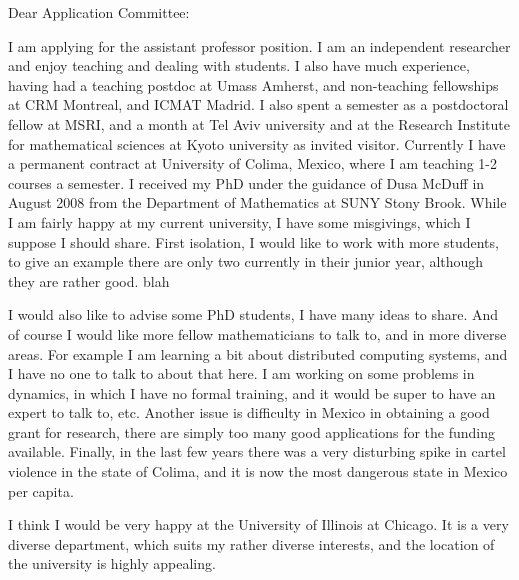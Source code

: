 \documentclass[12pt]{letter}
\date{Fall 2018}
\begin{document}
\begin{letter}{
}
\opening{Dear Application Committee:}   
I am applying for the assistant professor position. I am an independent researcher and enjoy teaching and dealing with students.
I also have much experience, having had a teaching postdoc at Umass Amherst, 
and non-teaching fellowships at CRM Montreal, and ICMAT Madrid. I also spent a semester as a postdoctoral fellow at MSRI, and a
month at Tel Aviv university and at the Research Institute for mathematical
sciences at Kyoto university as invited visitor. Currently I have a permanent contract at University of Colima,  Mexico, where I am teaching 1-2 courses a semester.
I received my PhD under the 
guidance of Dusa McDuff
in August 2008 from
the Department of Mathematics at SUNY Stony Brook.  While I am fairly happy at my current university,  
I have some misgivings, which I suppose I should share.
First isolation, I would like to work with more students, to give an example there are only two currently in their junior year, although they are rather good. blah

I would also like to advise some PhD students, I have many ideas to share. And of course I would like more fellow mathematicians to talk to, and in more diverse areas. For example I am learning a bit about distributed computing systems, and I have no one to talk to about that here. I am working on some problems in dynamics, in which I have no formal training, and it would be super to have an expert to talk to, etc.
Another issue is difficulty in Mexico in obtaining a good grant for research, there are simply too many good applications for the funding available.
Finally, in the last few years there was a very disturbing spike in cartel violence in the state of Colima, and it is now the most dangerous state in Mexico per capita. 


I think I would be very happy at the University of Illinois at Chicago.  It is a very diverse department, 
which suits my rather diverse interests,  and the location of the university
is highly appealing. 





\end{letter}
\end{document}
